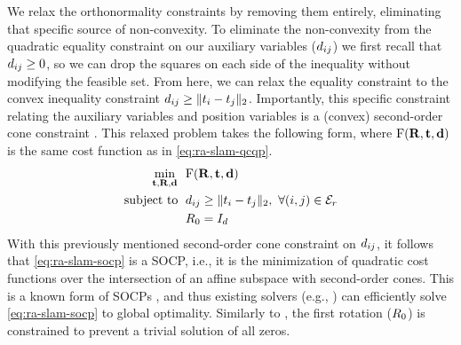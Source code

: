 We relax the orthonormality constraints by removing them entirely, eliminating
that specific source of non-convexity. To eliminate the non-convexity from the
quadratic equality constraint on our auxiliary variables ($d_{ij}$) we first
recall that $d_{ij} \geq 0$, so we can drop the squares on each side of the
inequality without modifying the feasible set. From here, we can relax the
equality constraint to the convex inequality constraint $ d_{ij} \geq \lVert
    t_i - t_j \rVert_2$. Importantly, this specific constraint relating the
auxiliary variables and position variables is a (convex) second-order cone
constraint \cite{boyd04book,alizadeh03mathematicalprogramming}. This relaxed
problem takes the following form, where $\text{F} (\bf R, \bf t, \bf d)$ is the same cost
function as in \cref{eq:ra-slam-qcqp}.
\begin{equation}
    \label{eq:ra-slam-socp}
    \begin{aligned}
         \min\limits_{\bf t, \bf R, \bf d} ~~ & \text{F} (\bf R, \bf t, \bf d) \\
         \textnormal{subject to\; } & d_{ij} \geq \lVert t_i - t_j \rVert_2,~\forall (i,j) \in \mathcal{E}_{r} \\
          & R_0 = I_d
    \end{aligned}
\end{equation}
With this previously mentioned second-order cone constraint on $d_{ij}$, it follows that
\cref{eq:ra-slam-socp} is a SOCP, i.e., it is the minimization of quadratic cost
functions over the intersection of an affine subspace with second-order
cones. This is a known form of SOCPs \cite{alizadeh03mathematicalprogramming},
and thus existing solvers (e.g., \cite{gurobi}) can efficiently solve
\cref{eq:ra-slam-socp} to global optimality. Similarly to \cite{martinec07cvpr},
the first rotation ($R_0$) is constrained to prevent a trivial solution of
all zeros.
